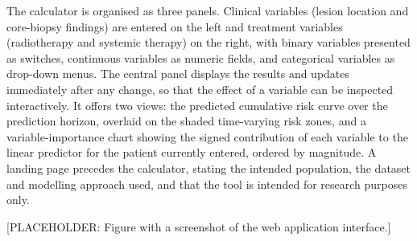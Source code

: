 The calculator is organised as three panels. Clinical variables (lesion location and core-biopsy findings) are entered on the left and treatment variables (radiotherapy and systemic therapy) on the right, with binary variables presented as switches, continuous variables as numeric fields, and categorical variables as drop-down menus. The central panel displays the results and updates immediately after any change, so that the effect of a variable can be inspected interactively. It offers two views: the predicted cumulative risk curve over the prediction horizon, overlaid on the shaded time-varying risk zones, and a variable-importance chart showing the signed contribution of each variable to the linear predictor for the patient currently entered, ordered by magnitude. A landing page precedes the calculator, stating the intended population, the dataset and modelling approach used, and that the tool is intended for research purposes only.

[PLACEHOLDER: Figure with a screenshot of the web application interface.]
